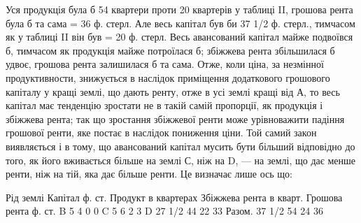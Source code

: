 Уся продукція була б 54 квартери проти 20 квартерів у таблиці II, грошова рента була
б та сама = 36 ф. стерл. Але весь капітал був би 37 1/2 ф. стерл., тимчасом як у таблиці II
він був = 20 ф. стерл. Весь авансований капітал майже подвоївся б, тимчасом як продукція майже
потроїлася б; збіжжева рента збільшилася б удвоє, грошова рента залишилася б та сама.
Отже, коли ціна, за незмінної продуктивности, знижується в наслідок приміщення
додаткового грошового капіталу у кращі землі, що дають ренту, отже
в усі землі кращі від А, то весь капітал має тенденцію зростати не в такій
самій пропорції, як продукція і збіжжева рента; так що зростання збіжжевої ренти
може урівноважити падіння грошової ренти, яке постає в наслідок пониження ціни.
Той самий закон виявляється і в тому, що авансований капітал мусить бути більший
відповідно до того, як його вживається більше на землі С, ніж на D, — на землі,
що дає менше ренти, ніж на тій, яка дає більше ренти. Це визначає лише ось що:

Рід  землі    Капітал ф. ст. Продукт в квартерах    Збіжжева рента в кварт. Грошова рента ф. ст.
B 5 4 0 0
C 5 6 2 3
D    27 1/2    44    22    33
Разом. 37 1/2      54    24    36
\parbreak{}  %
